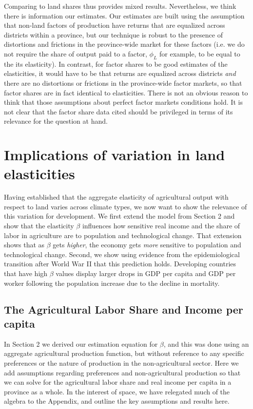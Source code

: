 \documentclass[11pt]{article}
\begin{document}
Comparing to land shares thus provides mixed results. Nevertheless, we think there is information our estimates. Our estimates are built using the assumption that non-land factors of production have returns that are equalized across districts within a province, but our technique is robust to the presence of distortions and frictions in the province-wide market for these factors (i.e. we do not require the share of output paid to a factor, $\phi_L$ for example, to be equal to the its elasticity). In contrast, for factor shares to be good estimates of the elasticities, it would have to be that returns are equalized across districts \textit{and} there are no distortions or frictions in the province-wide factor markets, so that factor shares are in fact identical to elasticities. There is not an obvious reason to think that those assumptions about perfect factor markets conditions hold. It is not clear that the factor share data cited should be privileged in terms of its relevance for the question at hand.

\section{Implications of variation in land elasticities}\label{SEC_implications}
Having established that the aggregate elasticity of agricultural output with respect to land varies across climate types, we now want to show the relevance of this variation for development. We first extend the model from Section 2 and show that the elasticity $\beta$ influences how sensitive real income and the share of labor in agriculture are to population and technological change. That extension shows that as $\beta$ gets \textit{higher}, the economy gets \textit{more} sensitive to population and technological change. Second, we show using evidence from the epidemiological transition after World War II that this prediction holds. Developing countries that have high $\beta$ values display larger drops in GDP per capita and GDP per worker following the population increase due to the decline in mortality.

\subsection{The Agricultural Labor Share and Income per capita}
In Section 2 we derived our estimation equation for $\beta$, and this was done using an aggregate agricultural production function, but without reference to any specific preferences or the nature of production in the non-agricultural sector. Here we add assumptions regarding preferences and non-agricultural production so that we can solve for the agricultural labor share and real income per capita in a province as a whole. In the interest of space, we have relegated much of the algebra to the Appendix, and outline the key assumptions and results here. 
\end{document}
